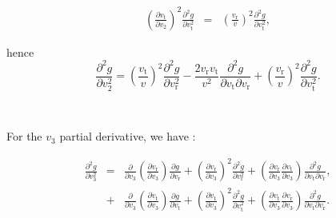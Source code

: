 \documentclass[11pt]{article}
\newcommand{\rt}{\mathrm{t}}
\newcommand{\rr}{\mathrm{r}}
\newcommand{\vr}{v_{\rr}}
\newcommand{\vt}{v_{\rt}}
\begin{document}
\begin{appendices}
\begin{equation}
\begin{array}{ccl}
  \displaystyle{\left(\frac{\partial \vt}{\partial v_{2}}\right)^{2}\frac{\partial^{2}g}{\partial \vt^{2}}}&=& \displaystyle{\left(\frac{\vr}{v}\right)^{2}\frac{\partial^{2}g}{\partial \vt^{2}}} ,
\end{array}
\label{eq:d2gdv22_Coeffs_Special}
\end{equation}

hence
\begin{equation}
  \frac{\partial^{2}g}{\partial v_{2}^{2}}  =\left(\frac{\vt}{v}\right)^{2}\frac{\partial^{2}g}{\partial \vr^{2}}-\frac{2\vr\vt}{v^{2}}\frac{\partial^{2}g}{\partial \vt\partial \vr}+\left(\frac{\vr}{v}\right)^{2}\frac{\partial^{2}g}{\partial \vt^{2}}.
   \label{eq:d2gdv22_Special}
\end{equation}

~

For the $v_{3}$ partial derivative, we have :

\begin{equation}
\begin{array}{ccl}
  \displaystyle{\frac{\partial^{2}g}{\partial v_{3}^{2}}}&=& \displaystyle{\frac{\partial}{\partial v_{3}}\left(\frac{\partial \vr}{\partial v_{3}}\right)\frac{\partial g}{\partial \vr}+\left(\frac{\partial \vr}{\partial v_{3}}\right)^{2}\frac{\partial^{2}g}{\partial \vr^{2}}+\left(\frac{\partial \vr}{\partial v_{3}}\frac{\partial \vt}{\partial v_{3}}\right)\frac{\partial^{2}g}{\partial \vt\partial \vr}} ,\\

  {} &+& \displaystyle{\frac{\partial}{\partial v_{3}}\left(\frac{\partial \vt}{\partial v_{3}}\right)\frac{\partial g}{\partial \vt}+\left(\frac{\partial \vt}{\partial v_{3}}\right)^{2}\frac{\partial^{2}g}{\partial \vt^{2}}+\left(\frac{\partial \vt}{\partial v_{3}}\frac{\partial \vr}{\partial v_{3}}\right)\frac{\partial^{2}g}{\partial \vt\partial \vr}} .
\end{array}
\label{eq:d2gdv32_Arbitrary}
\end{equation}


\end{appendices}
\end{document}
